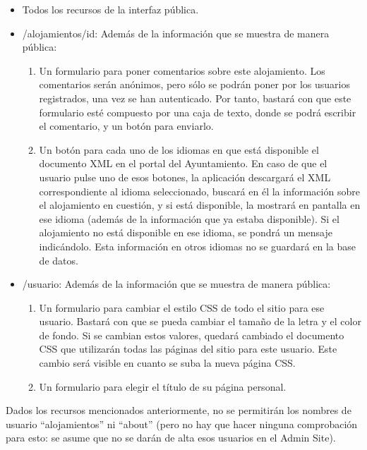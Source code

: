 \begin{itemize}
  \item Todos los recursos de la interfaz pública.
  
  \item /alojamientos/{id}: Además de la información que se muestra de manera pública:

    \begin{enumerate}
      \item Un formulario para poner comentarios sobre este alojamiento. Los comentarios serán anónimos, pero sólo se podrán poner por los usuarios registrados, una vez se han autenticado. Por tanto, bastará con que este formulario esté compuesto por una caja de texto, donde se podrá escribir el comentario, y un botón para enviarlo.
    \item Un botón para cada uno de los idiomas en que está disponible el documento XML en el portal del Ayuntamiento. En caso de que el usuario pulse uno de esos botones, la aplicación descargará el XML correspondiente al idioma seleccionado, buscará en él la información sobre el alojamiento en cuestión, y si está disponible, la mostrará en pantalla en ese idioma (además de la información que ya estaba disponible). Si el alojamiento no está disponible en ese idioma, se pondrá un mensaje indicándolo. Esta información en otros idiomas no se guardará en la base de datos.
  \end{enumerate}

  \item /{usuario}: Además de la información que se muestra de manera pública:
  
  \begin{enumerate}
    \item Un formulario para cambiar el estilo CSS de todo el sitio para ese usuario. Bastará con que se pueda cambiar el tamaño de la letra y el color de fondo. Si se cambian estos valores, quedará cambiado el documento CSS que utilizarán todas las páginas del sitio para este usuario. Este cambio será visible en cuanto se suba la nueva página CSS.

    \item Un formulario para elegir el título de su página personal.
  \end{enumerate}
\end{itemize}


Dados los recursos mencionados anteriormente, no se permitirán los nombres de usuario ``alojamientos'' ni ``about'' (pero no hay que hacer ninguna comprobación para esto: se asume que no se darán de alta esos usuarios en el Admin Site).



